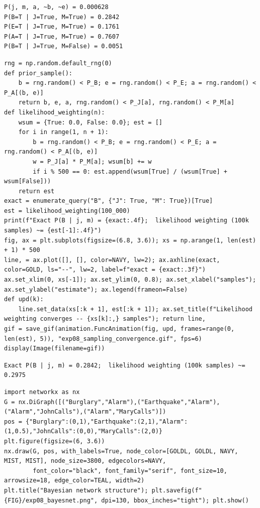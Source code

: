 \documentclass[11pt]{article}
\begin{document}
\begin{lstlisting}[style=out]
P(j, m, a, ~b, ~e) = 0.000628
P(B=T | J=True, M=True) = 0.2842
P(E=T | J=True, M=True) = 0.1761
P(A=T | J=True, M=True) = 0.7607
P(B=T | J=True, M=False) = 0.0051
\end{lstlisting}
\begin{lstlisting}[style=py]
rng = np.random.default_rng(0)
def prior_sample():
    b = rng.random() < P_B; e = rng.random() < P_E; a = rng.random() < P_A[(b, e)]
    return b, e, a, rng.random() < P_J[a], rng.random() < P_M[a]
def likelihood_weighting(n):
    wsum = {True: 0.0, False: 0.0}; est = []
    for i in range(1, n + 1):
        b = rng.random() < P_B; e = rng.random() < P_E; a = rng.random() < P_A[(b, e)]
        w = P_J[a] * P_M[a]; wsum[b] += w
        if i % 500 == 0: est.append(wsum[True] / (wsum[True] + wsum[False]))
    return est
exact = enumerate_query("B", {"J": True, "M": True})[True]
est = likelihood_weighting(100_000)
print(f"Exact P(B | j, m) = {exact:.4f};  likelihood weighting (100k samples) ~= {est[-1]:.4f}")
fig, ax = plt.subplots(figsize=(6.8, 3.6)); xs = np.arange(1, len(est) + 1) * 500
line, = ax.plot([], [], color=NAVY, lw=2); ax.axhline(exact, color=GOLD, ls="--", lw=2, label=f"exact = {exact:.3f}")
ax.set_xlim(0, xs[-1]); ax.set_ylim(0, 0.8); ax.set_xlabel("samples"); ax.set_ylabel("estimate"); ax.legend(frameon=False)
def upd(k):
    line.set_data(xs[:k + 1], est[:k + 1]); ax.set_title(f"Likelihood weighting converges -- {xs[k]:,} samples"); return line,
gif = save_gif(animation.FuncAnimation(fig, upd, frames=range(0, len(est), 5)), "exp08_sampling_convergence.gif", fps=6)
display(Image(filename=gif))
\end{lstlisting}
\begin{lstlisting}[style=out]
Exact P(B | j, m) = 0.2842;  likelihood weighting (100k samples) ~= 0.2975
\end{lstlisting}
\begin{lstlisting}[style=py]
import networkx as nx
G = nx.DiGraph([("Burglary","Alarm"),("Earthquake","Alarm"),("Alarm","JohnCalls"),("Alarm","MaryCalls")])
pos = {"Burglary":(0,1),"Earthquake":(2,1),"Alarm":(1,0.5),"JohnCalls":(0,0),"MaryCalls":(2,0)}
plt.figure(figsize=(6, 3.6))
nx.draw(G, pos, with_labels=True, node_color=[GOLDL, GOLDL, NAVY, MIST, MIST], node_size=3800, edgecolors=NAVY,
        font_color="black", font_family="serif", font_size=10, arrowsize=18, edge_color=TEAL, width=2)
plt.title("Bayesian network structure"); plt.savefig(f"{FIG}/exp08_bayesnet.png", dpi=130, bbox_inches="tight"); plt.show()
\end{lstlisting}
\end{document}
